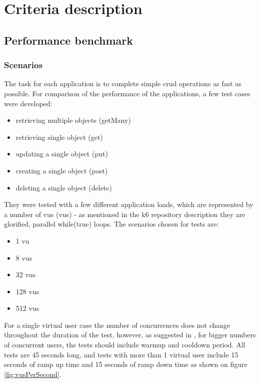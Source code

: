 
\chapter{Criteria description}

\section{Performance benchmark}

\subsection{Scenarios}
The task for each application is to complete simple \acrshort{crud} operations as fast as possible. For comparison of the performance of the applications, a few test cases were developed:

\begin{itemize}
    \item retrieving multiple objects (getMany)
    \item retrieving single object (get)
    \item updating a single object (put)
    \item creating a single object (post)
    \item deleting a single object (delete)
\end{itemize}

They were tested with a few different application loads, which are represented by a number of \acrlong{vu}s (\acrshort{vu}s) - as mentioned in the k6 repository description they are glorified, parallel while(true) loops.
The scenarios chosen for tests are:
\begin{itemize}
    \item 1 \acrshort{vu}
    \item 8 \acrshort{vu}s
    \item 32 \acrshort{vu}s
    \item 128 \acrshort{vu}s
    \item 512 \acrshort{vu}s
\end{itemize}
For a single virtual user case the number of concurrences does not change throughout the duration of the test, however, as suggested in
, for bigger numbers of concurrent users, the tests should include warmup and cooldown period. All tests are 45 seconds long, and tests with more than 1 virtual user include 15 seconds of ramp up time and 15 seconds of ramp down time as shown on figure \ref{fig:vusPerSecond}.

